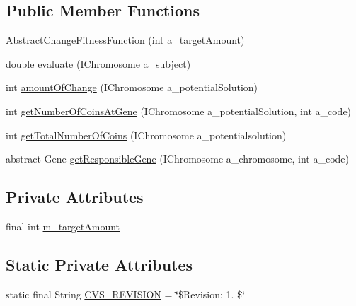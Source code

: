 \subsection*{Public Member Functions}
\begin{DoxyCompactItemize}
\item 
\hyperlink{classexamples_1_1supergene_1_1_abstract_change_fitness_function_a9c774cb1d329969e3ccfe12472674ce4}{Abstract\-Change\-Fitness\-Function} (int a\-\_\-target\-Amount)
\item 
double \hyperlink{classexamples_1_1supergene_1_1_abstract_change_fitness_function_a71d25b74851304848680b8714fe1ea91}{evaluate} (I\-Chromosome a\-\_\-subject)
\item 
int \hyperlink{classexamples_1_1supergene_1_1_abstract_change_fitness_function_ad3371c34b83fe593d4559661099cbeeb}{amount\-Of\-Change} (I\-Chromosome a\-\_\-potential\-Solution)
\item 
int \hyperlink{classexamples_1_1supergene_1_1_abstract_change_fitness_function_a220025df8f0ed3ca78d9a2546125e62d}{get\-Number\-Of\-Coins\-At\-Gene} (I\-Chromosome a\-\_\-potential\-Solution, int a\-\_\-code)
\item 
int \hyperlink{classexamples_1_1supergene_1_1_abstract_change_fitness_function_aacde9b3f541743a1840cc4d8539e97f7}{get\-Total\-Number\-Of\-Coins} (I\-Chromosome a\-\_\-potentialsolution)
\item 
abstract Gene \hyperlink{classexamples_1_1supergene_1_1_abstract_change_fitness_function_adf1b5ef070f57b87234a09fa075587b2}{get\-Responsible\-Gene} (I\-Chromosome a\-\_\-chromosome, int a\-\_\-code)
\end{DoxyCompactItemize}
\subsection*{Private Attributes}
\begin{DoxyCompactItemize}
\item 
final int \hyperlink{classexamples_1_1supergene_1_1_abstract_change_fitness_function_af113260ddde2433a26a6a266b2969e56}{m\-\_\-target\-Amount}
\end{DoxyCompactItemize}
\subsection*{Static Private Attributes}
\begin{DoxyCompactItemize}
\item 
static final String \hyperlink{classexamples_1_1supergene_1_1_abstract_change_fitness_function_a17bdff475188176a202a6a884ba82853}{C\-V\-S\-\_\-\-R\-E\-V\-I\-S\-I\-O\-N} = \char`\"{}\$Revision\-: 1. \$\char`\"{}
\end{DoxyCompactItemize}


